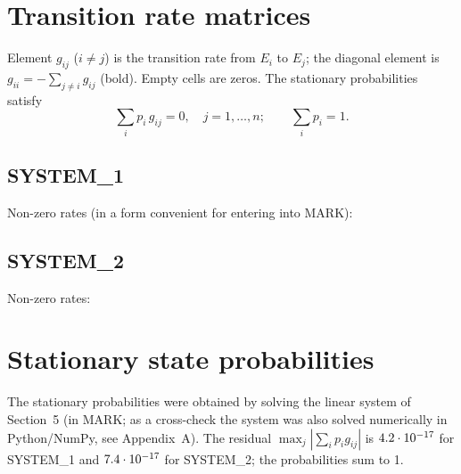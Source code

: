 \documentclass[12pt,a4paper]{article}
\begin{document}
\section{Transition rate matrices}
Element $g_{ij}$ ($i\ne j$) is the transition rate from $E_i$ to $E_j$; the diagonal element is
$g_{ii} = -\sum_{j\ne i} g_{ij}$ (bold). Empty cells are zeros.
The stationary probabilities satisfy
\[
\sum_{i} p_i\, g_{ij} = 0,\quad j=1,\dots,n; \qquad \sum_i p_i = 1 .
\]

\subsection{SYSTEM\_1}
\begin{table}[H]
\centering
\caption{Transition rate matrix $G_1$ (16$\times$16)}
\setlength{\tabcolsep}{1.2pt}
\resizebox{\textwidth}{!}{\tiny}
\end{table}
Non-zero rates (in a form convenient for entering into MARK):


\subsection{SYSTEM\_2}
\begin{table}[H]
\centering
\caption{Transition rate matrix $G_2$ (13$\times$13)}
\setlength{\tabcolsep}{2pt}
\resizebox{\textwidth}{!}{\scriptsize}
\end{table}
Non-zero rates:


\section{Stationary state probabilities}
The stationary probabilities were obtained by solving the linear system of Section~5
(in MARK; as a cross-check the system was also solved numerically in Python/NumPy, see Appendix~A).
The residual $\max_j|\sum_i p_i g_{ij}|$ is $4.2\cdot10^{-17}$ for SYSTEM\_1 and $7.4\cdot10^{-17}$
for SYSTEM\_2; the probabilities sum to 1.

\end{document}
